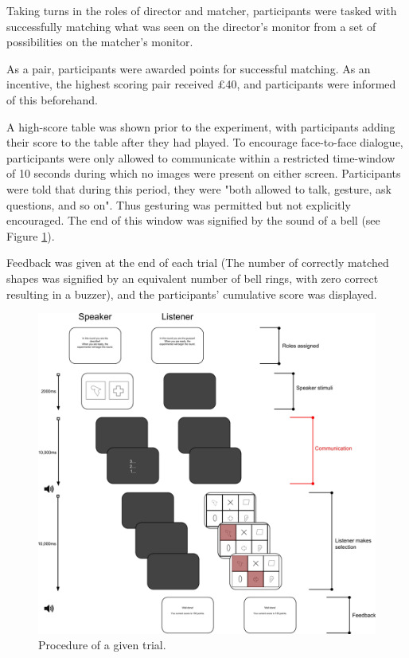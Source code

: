 \documentclass[a4paper,man,natbib]{apa6}
\begin{document}
Taking turns in the roles of director and matcher, participants were tasked with successfully matching what was seen on the director's monitor from a set of possibilities on the matcher's monitor.

As a pair, participants were awarded points for successful matching.
As an incentive, the highest scoring pair received £40, and participants were informed of this beforehand.

A high-score table was shown prior to the experiment, with participants adding their score to the table after they had played.
To encourage face-to-face dialogue, participants were only allowed to communicate within a restricted time-window of 10 seconds during which no images were present on either screen. 
Participants were told that during this period, they were "both allowed to talk, gesture, ask questions, and so on". 
Thus gesturing was permitted but not explicitly encouraged.
The end of this window was signified by the sound of a bell (see Figure \ref{fig:trial}).

Feedback was given at the end of each trial (The number of correctly matched shapes was signified by an equivalent number of bell rings, with zero correct resulting in a buzzer), and the participants' cumulative score was displayed.

\begin{figure}
  \centering
	\includegraphics[width=\linewidth]{trial.png}
  \caption{Procedure of a given trial.}
  \label{fig:trial}
\end{figure}
\end{document}
